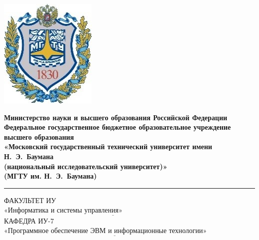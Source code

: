 \begin{titlepage}
	\fontsize{12pt}{12pt}\selectfont
	\noindent \begin{minipage}{0.15\textwidth}
		\includegraphics[width=\linewidth]{img/b_logo.jpg}
	\end{minipage}
	\noindent\begin{minipage}{0.85\textwidth}\centering
		\textbf{Министерство науки и высшего образования Российской Федерации}\\
		\textbf{Федеральное государственное бюджетное образовательное учреждение высшего образования}\\
		\textbf{«Московский государственный технический университет имени Н.~Э.~Баумана}\\
		\textbf{(национальный исследовательский университет)»}\\
		\textbf{(МГТУ им. Н.~Э.~Баумана)}
	\end{minipage}
	
	\noindent\rule{17cm}{3pt}
	\newline\newline
	\noindent ФАКУЛЬТЕТ ИУ $\underline{\text{«Информатика и системы управления»~~~~~~~~~~~~~~~~~~~~~~~~~~~~~~~~~~~~~~~~~~~}}$ \newline\newline
	\noindent КАФЕДРА ИУ-7 $\underline{\text{«Программное обеспечение ЭВМ и информационные технологии»~~~~~~~~}}$\newline\newline\newline\newline\newline
	

\end{titlepage}
